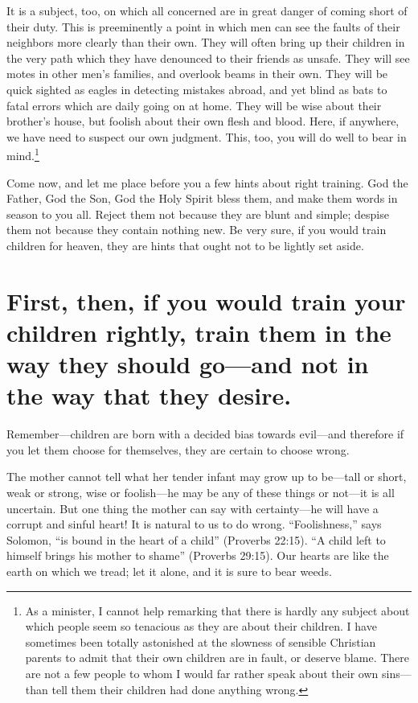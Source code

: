 \documentclass[
]{book}
\begin{document}
It is a subject, too, on which all concerned are in great danger of coming short of their duty. This is preeminently a point in which men can see the faults of their neighbors more clearly than their own. They will often bring up their children in the very path which they have denounced to their friends as unsafe. They will see motes in other men's families, and overlook beams in their own. They will be quick sighted as eagles in detecting mistakes abroad, and yet blind as bats to fatal errors which are daily going on at home. They will be wise about their brother's house, but foolish about their own flesh and blood. Here, if anywhere, we have need to suspect our own judgment. This, too, you will do well to bear in mind.\footnote{As a minister, I cannot help remarking that there is hardly any subject about which people seem so tenacious as they are about their children. I have sometimes been totally astonished at the slowness of sensible Christian parents to admit that their own children are in fault, or deserve blame. There are not a few people to whom I would far rather speak about their own sins---than tell them their children had done anything wrong.}

Come now, and let me place before you a few hints about right training. God the Father, God the Son, God the Holy Spirit bless them, and make them words in season to you all. Reject them not because they are blunt and simple; despise them not because they contain nothing new. Be very sure, if you would train children for heaven, they are hints that ought not to be lightly set aside.

\hypertarget{first-then-if-you-would-train-your-children-rightly-train-them-in-the-way-they-should-goand-not-in-the-way-that-they-desire.}{%
\chapter{First, then, if you would train your children rightly, train them in the way they should go---and not in the way that they desire.}\label{first-then-if-you-would-train-your-children-rightly-train-them-in-the-way-they-should-goand-not-in-the-way-that-they-desire.}}

Remember---children are born with a decided bias towards evil---and therefore if you let them choose for themselves, they are certain to choose wrong.

The mother cannot tell what her tender infant may grow up to be---tall or short, weak or strong, wise or foolish---he may be any of these things or not---it is all uncertain. But one thing the mother can say with certainty---he will have a corrupt and sinful heart! It is natural to us to do wrong. ``Foolishness,'' says Solomon, ``is bound in the heart of a child'' (Proverbs 22:15). ``A child left to himself brings his mother to shame'' (Proverbs 29:15). Our hearts are like the earth on which we tread; let it alone, and it is sure to bear weeds.
\end{document}
